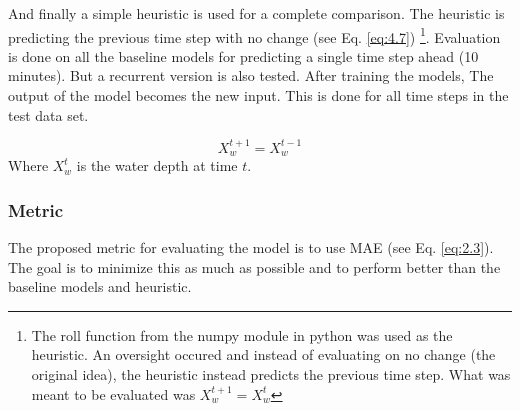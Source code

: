 And finally a simple heuristic is used for a complete comparison. The heuristic is predicting the previous time step with no change (see Eq. \ref{eq:4.7}) \footnote{The roll function from the numpy module in python was used as the heuristic. An oversight occured and instead of evaluating on no change (the original idea), the heuristic instead predicts the previous time step. What was meant to be evaluated was $X_{w}^{t+1} = X_{w}^{t}$}. Evaluation is done on all the baseline models for predicting a single time step ahead (10 minutes). But a recurrent version is also tested. After training the models, The output of the model becomes the new input. This is done for all time steps in the test data set.

\begin{equation}
	\label{eq:4.7}
	X_{w}^{t+1} =  X_{w}^{t-1}
\end{equation}
Where $X_{w}^{t}$ is the water depth at time $t$.

\subsubsection*{Metric}
The proposed metric for evaluating the model is to use MAE (see Eq. \ref{eq:2.3}). The goal is to minimize this as much as possible and to perform better than the baseline models and heuristic.
